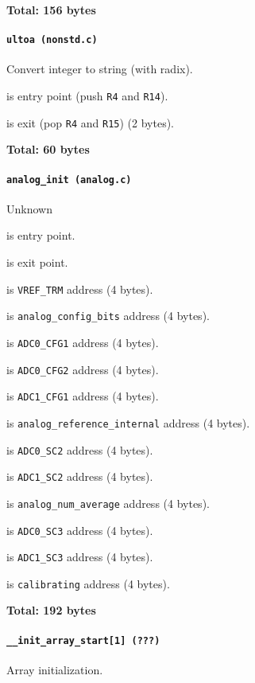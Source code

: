 \textbf{Total: 156 bytes}

\paragraph{\texttt{ultoa (nonstd.c)}} Convert integer to string (with radix).

 is entry point (push \texttt{R4} and \texttt{R14}).

 is exit (pop \texttt{R4} and \texttt{R15}) (2 bytes).

\textbf{Total: 60 bytes}

\paragraph{\texttt{analog\_init (analog.c)}} Unknown

 is entry point.

 is exit point.

 is \texttt{VREF\_TRM} address (4 bytes).

 is \texttt{analog\_config\_bits} address (4 bytes).

 is \texttt{ADC0\_CFG1} address (4 bytes).

 is \texttt{ADC0\_CFG2} address (4 bytes).

 is \texttt{ADC1\_CFG1} address (4 bytes).

 is \texttt{analog\_reference\_internal} address
(4 bytes).

 is \texttt{ADC0\_SC2} address (4 bytes).

 is \texttt{ADC1\_SC2} address (4 bytes).

 is \texttt{analog\_num\_average} address (4 bytes).

 is \texttt{ADC0\_SC3} address (4 bytes).

 is \texttt{ADC1\_SC3} address (4 bytes).

 is \texttt{calibrating} address (4 bytes).

\textbf{Total: 192 bytes}

\paragraph{\texttt{\_\_init\_array\_start[1] (???)}} Array initialization.

